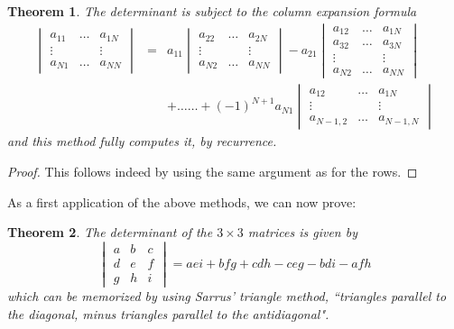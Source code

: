 \documentclass[12pt]{amsbook}
\newtheorem{theorem}{Theorem}[chapter]
\begin{document}
\begin{theorem}
The determinant is subject to the column expansion formula
\begin{eqnarray*}
\begin{vmatrix}a_{11}&\ldots&a_{1N}\\
\vdots&&\vdots\\
a_{N1}&\ldots&a_{NN}\end{vmatrix}
&=&a_{11}\begin{vmatrix}a_{22}&\ldots&a_{2N}\\
\vdots&&\vdots\\
a_{N2}&\ldots&a_{NN}\end{vmatrix}
-a_{21}\begin{vmatrix}a_{12}&\ldots&a_{1N}\\
a_{32}&\ldots&a_{3N}\\
\vdots&&\vdots\\
a_{N2}&\ldots&a_{NN}\end{vmatrix}\\
&&+\ldots\ldots
+(-1)^{N+1}a_{N1}\begin{vmatrix}a_{12}&\ldots&a_{1N}\\
\vdots&&\vdots\\
a_{N-1,2}&\ldots&a_{N-1,N}\end{vmatrix}
\end{eqnarray*}
and this method fully computes it, by recurrence.
\end{theorem}

\begin{proof}
This follows indeed by using the same argument as for the rows.
\end{proof}

As a first application of the above methods, we can now prove:


\begin{theorem}
The determinant of the $3\times3$ matrices is given by
$$\begin{vmatrix}a&b&c\\ d&e&f\\ g&h&i\end{vmatrix}=aei+bfg+cdh-ceg-bdi-afh$$
which can be memorized by using Sarrus' triangle method, ``triangles parallel to the diagonal, minus triangles parallel to the antidiagonal".
\end{theorem}
\end{document}
